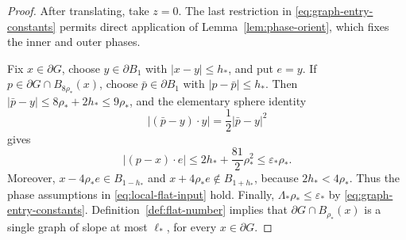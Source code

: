 \documentclass[11pt]{amsart}
\theoremstyle{definition}
\begin{document}
\begin{proof}
After translating, take \(z=0\).  The last restriction in
\eqref{eq:graph-entry-constants} permits direct application of
Lemma~\ref{lem:phase-orient}, which fixes the inner and outer phases.

Fix \(x\in\partial G\), choose \(y\in\partial B_1\) with
\(|x-y|\le h_*\), and put \(e=y\).  If
\(p\in\partial G\cap B_{8\rho_*}(x)\), choose
\(\bar p\in\partial B_1\) with \(|p-\bar p|\le h_*\).  Then
\(|\bar p-y|\le8\rho_*+2h_*\le9\rho_*\), and the elementary sphere
identity
\[
   |(\bar p-y)\cdot y|=\frac12|\bar p-y|^2
\]
gives
\[
   |(p-x)\cdot e|
   \le2h_*+\frac{81}{2}\rho_*^2
   \le\varepsilon_*\rho_*.
\tag{4.94}\label{eq:sphere-to-slab}
\]
Moreover, \(x-4\rho_*e\in B_{1-h_*}\) and
\(x+4\rho_*e\notin B_{1+h_*}\), because \(2h_*<4\rho_*\).
Thus the phase assumptions in \eqref{eq:local-flat-input} hold.  Finally,
\(\Lambda_*\rho_*\le\varepsilon_*\) by
\eqref{eq:graph-entry-constants}.  Definition~\ref{def:flat-number}
implies that \(\partial G\cap B_{\rho_*}(x)\) is a single graph of
slope at most \(\ell_*\), for every \(x\in\partial G\).


\end{proof}
\end{document}
